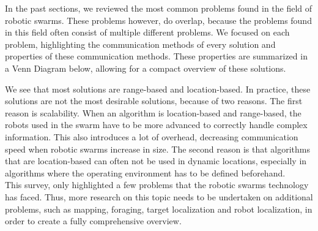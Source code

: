 

%

In the past sections, we reviewed the most common problems found in the field of robotic swarms. 
These problems however, do overlap, because the problems found in this field often consist of multiple different problems. 
We focused on each problem, highlighting the communication methods of every solution and properties of these communication methods. 
These properties are summarized in a Venn Diagram below, allowing for a compact overview of these solutions. 



We see that most solutions are range-based and location-based. 
In practice, these solutions are not the most desirable solutions, because of two reasons. 
The first reason is scalability. 
When an algorithm is location-based and range-based, the robots used in the swarm have to be more advanced to correctly handle complex information. 
This also introduces a lot of overhead, decreasing communication speed when robotic swarms increase in size. 
The second reason is that algorithms that are location-based can often not be used in dynamic locations, especially in algorithms where the operating environment has to be defined beforehand.\\

This survey, only highlighted a few problems that the robotic swarms technology has faced. Thus, more research on this topic needs to be undertaken on additional problems, such as mapping, foraging, target localization and robot localization, in order to create a fully comprehensive overview.

